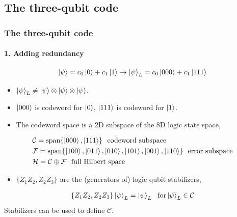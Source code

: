 \documentclass{beamer}
\newcommand{\mc}{\mathcal}
\renewcommand{\(}{\left(}
\renewcommand{\)}{\right)}
\renewcommand{\[}{\left[}
\renewcommand{\]}{\right]}
\begin{document}
\subsection{The three-qubit code}
\begin{frame}
    \frametitle{The three-qubit code}
    \framesubtitle{1. Adding redundancy}
    \begin{align*}
        \ket{\psi} = c_0 \ket{0} + c_1 \ket{1} \rightarrow \ket{\psi}_L= c_0 \ket{000} + c_1 \ket{111}
    \end{align*}
    \pause
    \begin{itemize}
        \item $\ket{\psi}_L \neq \ket{\psi} \otimes \ket{\psi} \otimes \ket{\psi}$.
        \item $\ket{000}$ is codeword for $\ket{0}$, $\ket{111}$ is codeword for $\ket{1}$.  
        \item The codeword space is a 2D subspace of the 8D logic state space,
    \end{itemize}
    \pause
    \begin{align*}
        &\mc C = \text{span}\{\ket{000}, \ket{111}\} \ \  \text{codeword subspace} \\ 
        &\mc F = \text{span}\{\ket{100}, \ket{011}, \ket{010}, \ket{101}, \ket{001}, \ket{110}\} \ \  \text{error subspace} \\ 
        &\mc H =\mc C \oplus \mc F \ \  \text{full Hilbert space}
    \end{align*}
    \pause
    \begin{itemize}
        \item $\{Z_1Z_2, Z_2Z_3\}$ are the (generators of) logic qubit stabilizers, 
    \end{itemize}
    \begin{align*}
        \{Z_1Z_2, Z_2Z_3\} \ket{\psi}_L = \ket{\psi}_L \ \ \text{for} \ket{\psi}_L \in \mc C
    \end{align*}
    Stabilizers can be used to define $\mc C$.
\end{frame}
\end{document}
